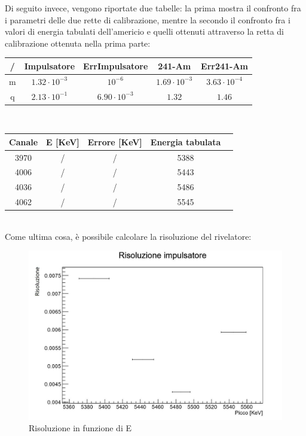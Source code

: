 \documentclass[a4paper,10pt]{article}
\begin{document}
Di seguito invece, vengono riportate due tabelle: la prima mostra il confronto fra i parametri delle due rette di calibrazione, mentre la secondo il confronto fra i valori di energia tabulati dell'americio e quelli ottenuti attraverso la retta di calibrazione ottenuta nella prima parte:\\

\begin{tabular}{ccccc}
\toprule
/ & Impulsatore & ErrImpulsatore & 241-Am & Err241-Am\\
\midrule
m & $1.32\cdot10^{-3}$ & $10^{-6}$ & $1.69\cdot10^{-3}$ & $3.63\cdot10^{-4}$\\
q & $2.13\cdot10^{-1}$ & $6.90\cdot10^{-3}$ & $1.32$ & $1.46$\\
\bottomrule
\end{tabular}\\

\begin{tabular}{ccccc}
\toprule
Canale & E [KeV] & Errore [KeV] & Energia tabulata\\
\midrule
3970 & / & / & 5388\\
4006 & / & / & 5443\\
4036 & / & / & 5486\\
4062 & / & / & 5545\\
\bottomrule
\end{tabular}\\

Come ultima cosa, è possibile calcolare la risoluzione del rivelatore:\\

\begin{figure}[H]
\centering
\includegraphics[scale=0.5]{risoluzione.jpg}
\caption{Risoluzione in funzione di E}
\end{figure}
\end{document}
